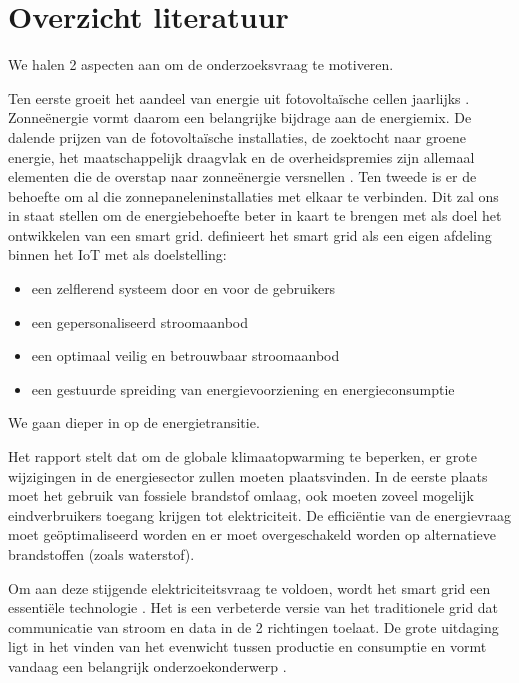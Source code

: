 \documentclass{hogent-article}
\begin{document}
    \section{Overzicht literatuur}
    
    
    We halen 2 aspecten aan om de onderzoeksvraag te motiveren.
    
    Ten eerste groeit het aandeel van energie uit fotovoltaïsche cellen jaarlijks \autocite{Shurtleff2014}. Zonneënergie vormt daarom een belangrijke bijdrage aan de energiemix. De dalende prijzen van de fotovoltaïsche installaties, de zoektocht naar groene energie, het maatschappelijk draagvlak en de overheidspremies zijn allemaal elementen die de overstap naar zonneënergie versnellen \autocite{Kouro2015}.
    Ten tweede is er de behoefte om al die zonnepaneleninstallaties met elkaar te verbinden. Dit zal ons in staat stellen om de energiebehoefte beter in kaart te brengen met als doel het ontwikkelen van een smart grid. \textcite{Vijayapriya2011} definieert het smart grid als een eigen afdeling binnen het IoT met als doelstelling:
    \begin{itemize}
        \item een zelflerend systeem door en voor de gebruikers
        \item een gepersonaliseerd stroomaanbod
        \item een optimaal veilig en betrouwbaar stroomaanbod
        \item een gestuurde spreiding van energievoorziening en energieconsumptie
    \end{itemize}

    We gaan dieper in op de energietransitie.
    
    Het \textcite{IPCC2022} rapport stelt dat om de globale klimaatopwarming te beperken, er grote wijzigingen in de energiesector zullen moeten plaatsvinden. In de eerste plaats moet het gebruik van fossiele brandstof omlaag, ook moeten zoveel mogelijk eindverbruikers toegang krijgen tot elektriciteit. De efficiëntie van de energievraag moet geöptimaliseerd worden en er moet overgeschakeld worden op alternatieve brandstoffen (zoals waterstof).
    
    Om aan deze stijgende elektriciteitsvraag te voldoen, wordt het smart grid een essentiële technologie \autocite{Patel2022}. Het is een verbeterde versie van het traditionele grid dat communicatie van stroom en data in de 2 richtingen toelaat. De grote uitdaging ligt in het vinden van het evenwicht tussen productie en consumptie en vormt vandaag een belangrijk onderzoekonderwerp \autocite{KouveliotisLysikatos2022}.
    
\end{document}

